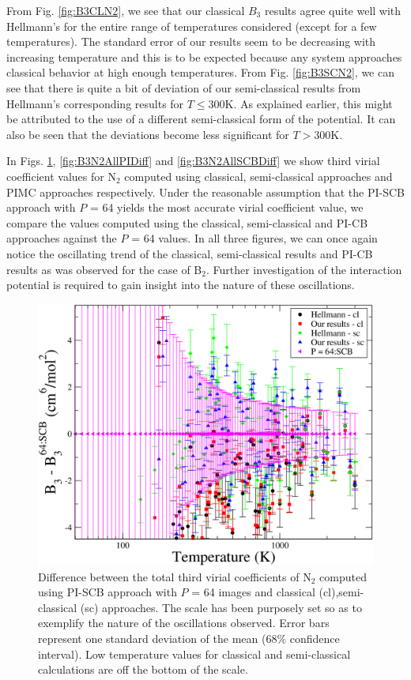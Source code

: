         From Fig. \ref{fig:B3CLN2}, we see that our classical $B_3$ results agree quite well with Hellmann's for the entire range of temperatures considered (except for a few temperatures). The standard error of our results seem to be decreasing with increasing temperature and this is to be expected because any system approaches classical behavior at high enough temperatures. From Fig. \ref{fig:B3SCN2}, we can see that there is quite a bit of deviation of our semi-classical results from Hellmann's corresponding results for $T \le 300$K. As explained earlier, this might be attributed to the use of a different semi-classical form of the \abinitio{} potential. It can also be seen that the deviations become less significant for $T > 300$K.

        \ifSCB
            In Figs. \ref{fig:B3N2AllCLSCDiff}, \ref{fig:B3N2AllPIDiff} and \ref{fig:B3N2AllSCBDiff} we show third virial coefficient values for N$_2$ computed using classical, semi-classical approaches and PIMC approaches respectively. Under the reasonable assumption that the PI-SCB approach with $P$ = 64 yields the most accurate virial coefficient value, we compare the values computed using the classical, semi-classical and PI-CB approaches against the $P$ = 64 values. In all three figures, we can once again notice the oscillating trend of the classical, semi-classical results and PI-CB results as was observed for the case of B$_2$. Further investigation of the \abinitio{} interaction potential is required to gain insight into the nature of these oscillations.
            \begin{figure}[!htbp]
                \centering
                \includegraphics[scale=0.20,keepaspectratio]{Chapter-5/Figures/B3N2AllCLSCDiffZoomed.png}
                \caption{Difference between the total third virial coefficients of N$_2$ computed using PI-SCB approach with $P$ = 64 images and classical (cl),semi-classical (sc) approaches. The scale has been purposely set so as to exemplify the nature of the oscillations observed. Error bars represent one standard deviation of the mean (68\% confidence interval). Low temperature values for classical and semi-classical calculations are off the bottom of the scale.}
                \label{fig:B3N2AllCLSCDiff}
            \end{figure}
